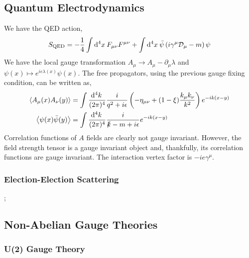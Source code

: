 \documentclass[12pt]{extarticle}
\begin{document}
\subsection{Quantum Electrodynamics}

We have the QED action,
\[ S_{\mathrm{QED}} = - \frac{1}{4} \int \mathrm{d}^{4} x \: F_{\mu \nu} F^{\mu \nu} + \int \mathrm{d}^{4} x \: \bar{\psi} \left( i \gamma^\mu \mathcal{D}_\mu - m \right) \psi \]
We have the local gauge transformation $A_\mu \to A_\mu - \partial_\mu \lambda$ and $\psi(x) \mapsto e^{i e \lambda(x)} \psi(x)$. 
The free propagators, using the previous gauge fixing condition, can be written as,
\begin{align*}
\left< A_\mu(x) A_\nu(y) \right> & = \int \frac{\mathrm{d}^{4} k \:}{(2 \pi)^4} \frac{i}{q^2 + i \epsilon} \left( - \eta_{\mu \nu} + (1 - \xi) \frac{k_\mu k_\nu}{k^2}  \right) e^{-i k (x - y) } 
\\
\left< \psi(x) \bar{\psi}(y) \right> & = \int \frac{\mathrm{d}^{4} k \:}{(2 \pi)^4} \frac{i}{\slashed{k} - m + i \epsilon} e^{-i k (x - y)} 
\end{align*} 
Correlation functions of $A$ fields are clearly not gauge invariant. However, the field strength tensor is a gauge invariant object and, thankfully, its correlation functions are gauge invariant. The interaction vertex factor is $- ie \gamma^\mu$. 

\subsubsection{Election-Election Scattering}

\begin{center}
;
\end{center} 
 
 
\subsection{Non-Abelian Gauge Theories}

\subsubsection{U(2) Gauge Theory}
\end{document}
